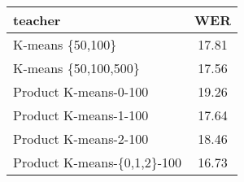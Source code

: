 
\begin{tabular}{lc}
    \toprule
    teacher & WER \\
    \midrule\midrule
    K-means \{50,100\}       & 17.81 \\
    K-means \{50,100,500\}   & 17.56 \\
    \midrule
    Product K-means-0-100 & 19.26 \\
    Product K-means-1-100 & 17.64 \\
    Product K-means-2-100 & 18.46 \\
    Product K-means-\{0,1,2\}-100 & 16.73 \\
    \bottomrule
\end{tabular}%